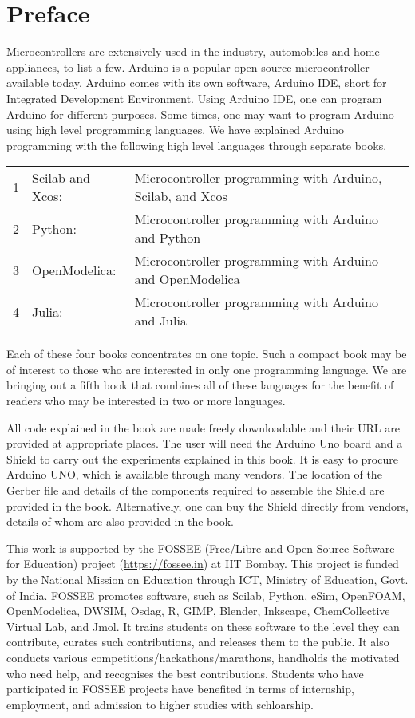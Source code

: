 \chapter*{Preface}
Microcontrollers are extensively used in the
industry, automobiles and home appliances, to list a few. 
Arduino is a popular open source microcontroller available today.
Arduino comes with its own software, Arduino IDE, short for Integrated
Development Environment.  Using Arduino IDE, one can program Arduino
for different purposes.  Some times, one may want to program Arduino
using high level programming languages.  We have explained Arduino
programming with the following high level languages through separate
books. 
\begin{center}
\begin{tabular}{llp{9cm}}
1 & Scilab and Xcos: & Microcontroller programming with Arduino,
Scilab, and Xcos \\
2 & Python: & Microcontroller programming with Arduino and Python \\
3 & OpenModelica: & Microcontroller programming with Arduino and
OpenModelica \\ 
4 & Julia: & Microcontroller programming with Arduino and Julia \\
\end{tabular}
\end{center}

Each of these four books concentrates on one topic.  Such a compact
book may be of interest to those who are interested in only one
programming language.  We are bringing out a fifth book that combines
all of these languages for the benefit of readers 
who may be interested in two or more languages.

All code explained in the book are made freely downloadable and their
URL are provided at appropriate places.  The user will need the
Arduino Uno board and a Shield to carry out the experiments explained
in this book.  It is easy to procure Arduino UNO, which is available
through many vendors.  The location of the Gerber file and details of
the components required to assemble the Shield are provided in the
book.  Alternatively, one can buy the Shield directly from vendors,
details of whom are also provided in the book.

This work is supported by the FOSSEE (Free/Libre and Open Source
Software for Education) project (\url{https://fossee.in}) at IIT
Bombay.  This project is funded by the National Mission on Education
through ICT, Ministry of Education, Govt. of India.  FOSSEE promotes
software, such as Scilab, Python, eSim, OpenFOAM, OpenModelica, DWSIM,
Osdag, R, GIMP, Blender, Inkscape, ChemCollective Virtual Lab, and
Jmol.  It trains students on these software to the level they can
contribute, curates such contributions, and releases them to the
public.  It also conducts various competitions/hackathons/marathons,
handholds the motivated who need help, and recognises the best
contributions.  Students who have participated in FOSSEE projects have
benefited in terms of internship, employment, and admission to higher
studies with schloarship.

